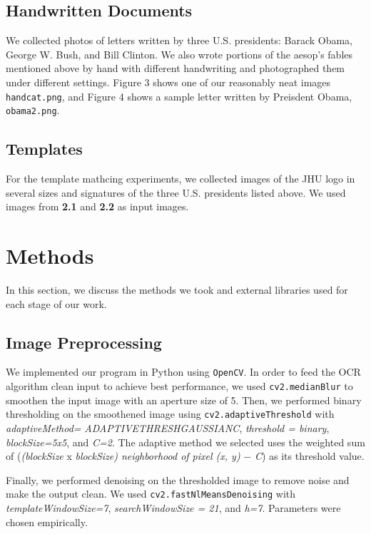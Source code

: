 \documentclass[11pt,letterpaper]{article}
\begin{document}
\subsection{Handwritten Documents}

We collected photos of letters written by three U.S. presidents: Barack Obama, George W. Bush, and Bill Clinton. We also wrote portions of the aesop's fables mentioned above by hand with different handwriting and photographed them under different settings. Figure 3 shows one of our reasonably neat images {\tt hand\textunderscore cat.png}, and Figure 4 shows a sample letter written by Preisdent Obama, {\tt obama2.png}.

\subsection{Templates}

For the template mathcing experiments, we collected images of the JHU logo in several sizes and signatures of the three U.S. presidents listed above. We used images from \textbf{2.1} and \textbf{2.2} as input images.

\section{Methods}

In this section, we discuss the methods we took and external libraries used for each stage of our work.

\subsection{Image Preprocessing}

We implemented our program in Python using {\tt OpenCV}. In order to feed the OCR algorithm clean input to achieve best performance, we used {\tt cv2.medianBlur} to smoothen the input image with an aperture size of 5. Then, we performed binary thresholding on the smoothened image using {\tt cv2.adaptiveThreshold} with \textit{adaptiveMethod=} \textit{ ADAPTIVE\textunderscore THRESH\textunderscore GAUSSIAN\textunderscore C}, \textit{threshold = binary}, \textit{blockSize=5x5}, and \textit{C=2}. The adaptive method we selected uses the weighted sum of (\textit{(blockSize} x \textit{blockSize) neighborhood of pixel (x, y)} $-$ \textit{C}) as its threshold value.

Finally, we performed denoising on the thresholded image to remove noise and make the output clean. We used {\tt cv2.fastNlMeansDenoising} with \textit{templateWindowSize=7}, \textit{searchWindowSize = 21}, and \textit{h=7}. Parameters were chosen empirically.
\end{document}
